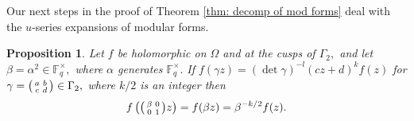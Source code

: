 \documentclass[11pt]{amsart}
\newtheorem{proposition}[theorem]{Proposition}
\theoremstyle{definition}
\newenvironment{psmallmatrix}
{\left(\begin{smallmatrix}}
	{\end{smallmatrix}\right)}
\numberwithin{equation}{section}
\newcommand{\bbF}{\mathbb{F}}		%
\begin{document}
Our next steps in the proof of Theorem \ref{thm: decomp of mod forms} deal with the $u$-series expansions of modular forms. 
\begin{proposition}\label{p: generator trick}
Let $f$ be holomorphic on $\Omega$ and at the cusps of $\Gamma_2,$ and let $\beta=\alpha^2\in \bbF_q^{\times},$ where $\alpha$ generates $\bbF_q^{\times}.$ If $f(\gamma z)=(\det\gamma)^{-l}(cz+d)^kf(z)$ for $\displaystyle{\gamma=\begin{psmallmatrix}a&b\\c&d\end{psmallmatrix}\in \Gamma_2},$ where $k/2$ is an integer then \[f\left(\begin{psmallmatrix}\beta&0\\0&1\end{psmallmatrix}z \right) = f(\beta z)=\beta^{-k/2}f(z).\]
\end{proposition}
\end{document}
